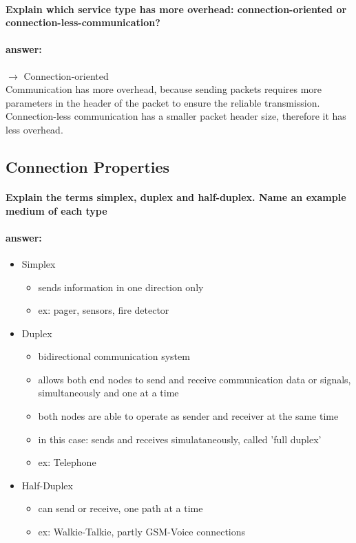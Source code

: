 \documentclass[a4paper,11pt]{article}
\begin{document}
 \paragraph{Explain which service type has more overhead: connection-oriented or connection-less-communication?} 
 \paragraph{answer:} 
 $\rightarrow$ Connection-oriented\\
 Communication has more overhead, because sending packets requires more parameters in the header of the packet to ensure the reliable transmission. Connection-less communication has a smaller packet header size, therefore it has less overhead. 
 
 
 \subsection{Connection Properties}
 \paragraph{Explain the terms simplex, duplex and half-duplex. Name an example medium of each type}
 \paragraph{answer:}
 \begin{itemize}
 	\item Simplex
 	 \begin{itemize}
 		\item  sends information in one direction only
 		\item  ex: pager, sensors, fire detector
 	\end{itemize}
 
 	\item Duplex
 	\begin{itemize}
 		\item  bidirectional communication system
 		\item  allows both end nodes to send and receive communication data or signals, simultaneously and one at a time
 		\item  both nodes are able to operate as sender and receiver at the same time
 		\item  in this case: sends and receives simulataneously, called 'full duplex'
 		\item  ex: Telephone
 	\end{itemize}
 
 	\item Half-Duplex
 	\begin{itemize}
 		\item  can send or receive, one path at a time
 		\item  ex: Walkie-Talkie, partly GSM-Voice connections
 	\end{itemize}
 \end{itemize}
 
\end{document}
